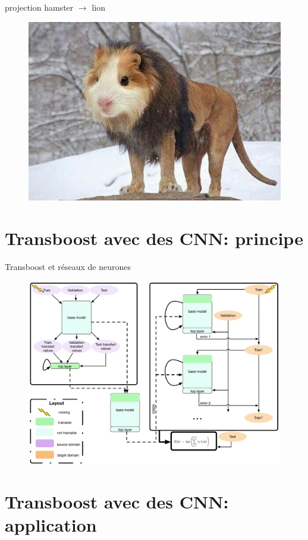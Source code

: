 \documentclass{beamer}
\begin{document}
\begin{frame}{projection hamster $\rightarrow$ lion}
	\begin{figure}
		\includegraphics[width=.8\textwidth]{projectionImage.jpg}
	\end{figure}
\end{frame}
\section{Transboost avec des CNN: principe}
\begin{frame}{Transboost et réseaux de neurones}
	\begin{figure}
		\includegraphics[width=.9\textwidth]{fig1.pdf}
	\end{figure}
\end{frame}

\section{Transboost avec des CNN: application}
\end{document}
